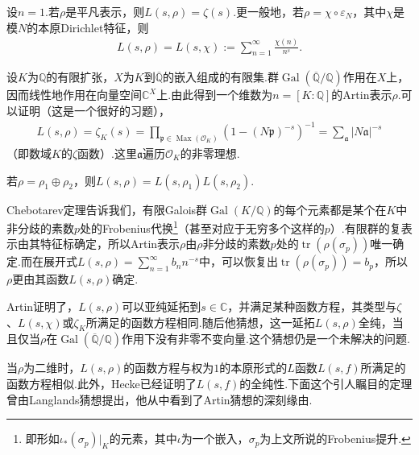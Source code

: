 \begin{exercise*}

设$n=1$.若$\rho$是平凡表示，则$L(s,\rho)=\zeta(s)$.更一般地，若$\rho=\chi\circ\varepsilon_N$，其中$\chi$是模$N$的本原Dirichlet特征，则
\begin{align*}
L(s,\rho)=L(s,\chi):=\sum_{n=1}^\infty\frac{\chi(n)}{n^s}.
\end{align*}
\end{exercise*}

\begin{example*}

设$K$为$\mathbb Q$的有限扩张，$X$为$K$到$\overline{\mathbb Q}$的嵌入组成的有限集.群$\operatorname{Gal}(\overline{\mathbb Q}/\mathbb Q)$作用在$X$上，因而线性地作用在向量空间$\mathbb C^X$上.由此得到一个维数为$n=[K:\mathbb Q]$的Artin表示$\rho$.可以证明（这是一个很好的习题），
\begin{align*}
L(s,\rho)=\zeta_K(s)
=\prod_{\mathfrak p\in\operatorname{Max}(\mathcal O_K)}\left(1-(N\mathfrak p)^{-s}\right)^{-1}
=\sum_{\mathfrak a}|N\mathfrak a|^{-s}
\end{align*}
（即数域$K$的$\zeta$函数）.这里$\mathfrak a$遍历$\mathcal O_K$的非零理想.

\end{example*}

\begin{remark*}

若$\rho=\rho_1\oplus\rho_2$，则$L(s,\rho)=L(s,\rho_1)L(s,\rho_2)$.

\end{remark*}

Chebotarev定理告诉我们，有限Galois群$\operatorname{Gal}(K/\mathbb Q)$的每个元素都是某个在$K$中非分歧的素数$p$处的Frobenius代换\footnote{即形如$\iota_*(\sigma_p)|_K$的元素，其中$\iota$为一个嵌入，$\sigma_p$为上文所说的Frobenius提升.}（甚至对应于无穷多个这样的$p$）.有限群的复表示由其特征标确定，所以Artin表示$\rho$由$\rho$非分歧的素数$p$处的$\operatorname{tr}(\rho(\sigma_p))$唯一确定.而在展开式$L(s,\rho)=\sum_{n=1}^\infty b_n n^{-s}$中，可以恢复出$\operatorname{tr}(\rho(\sigma_p))=b_p$，所以$\rho$更由其函数$L(s,\rho)$确定.

Artin证明了，$L(s,\rho)$可以亚纯延拓到$s\in\mathbb C$，并满足某种函数方程，其类型与$\zeta$、$L(s,\chi)$或$\zeta_K$所满足的函数方程相同.随后他猜想，这一延拓$L(s,\rho)$全纯，当且仅当$\rho$在$\operatorname{Gal}(\overline{\mathbb Q}/\mathbb Q)$作用下没有非零不变向量.这个猜想仍是一个未解决的问题.

当$\rho$为二维时，$L(s,\rho)$的函数方程与权为$1$的本原形式的$L$函数$L(s,f)$所满足的函数方程相似.此外，Hecke已经证明了$L(s,f)$的全纯性.下面这个引人瞩目的定理曾由Langlands猜想提出，他从中看到了Artin猜想的深刻缘由.

